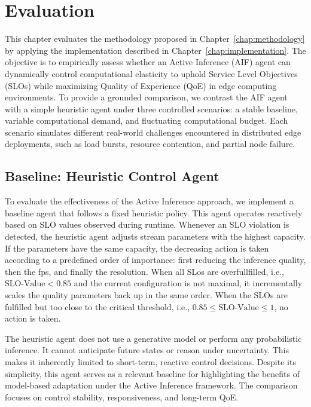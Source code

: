 \chapter{Evaluation}
\label{chap:evaluation}

This chapter evaluates the methodology proposed in Chapter~\ref{chap:methodology} by applying the implementation described in Chapter~\ref{chap:implementation}. The objective is to empirically assess whether an Active Inference (AIF) agent can dynamically control computational elasticity to uphold Service Level Objectives (SLOs) while maximizing Quality of Experience (QoE) in edge computing environments. To provide a grounded comparison, we contrast the AIF agent with a simple heuristic agent under three controlled scenarios: a stable baseline, variable computational demand, and fluctuating computational budget. Each scenario simulates different real-world challenges encountered in distributed edge deployments, such as load bursts, resource contention, and partial node failure.

\section{Baseline: Heuristic Control Agent}
\label{sec:evaluation-heuristic}

To evaluate the effectiveness of the Active Inference approach, we implement a baseline agent that follows a fixed heuristic policy. This agent operates reactively based on SLO values observed during runtime. Whenever an SLO violation is detected, the heuristic agent adjusts stream parameters with the highest capacity. If the parameters have the same capacity, the decreasing action is taken according to a predefined order of importance: first reducing the inference quality, then the fps, and finally the resolution. When all SLos are overfullfilled, i.e., \(\text{SLO-Value} < 0.85\) and the current configuration is not maximal, it incrementally scales the quality parameters back up in the same order.
When the SLOs are fulfilled but too close to the critical threshold, i.e., \(0.85 \leq \text{SLO-Value} \leq 1\), no action is taken.

The heuristic agent does not use a generative model or perform any probabilistic inference. It cannot anticipate future states or reason under uncertainty. This makes it inherently limited to short-term, reactive control decisions. Despite its simplicity, this agent serves as a relevant baseline for highlighting the benefits of model-based adaptation under the Active Inference framework. The comparison focuses on control stability, responsiveness, and long-term QoE.

